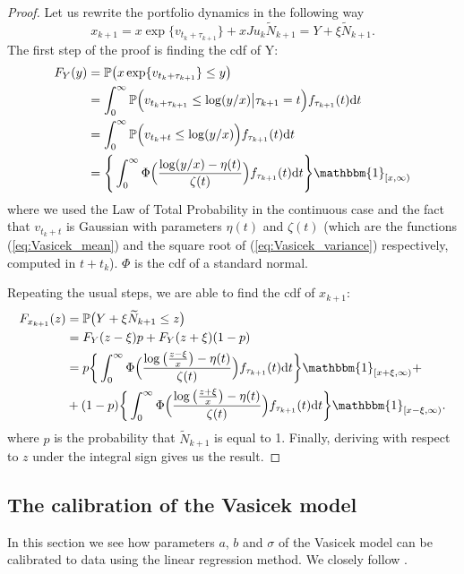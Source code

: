 \begin{proof}
	Let us rewrite the portfolio dynamics in the following way
	\[
	x_{k+1}=x\exp\{v_{t_k+\tau_{k+1}}\} + xJu_k\widetilde{N}_{k+1}=Y+\xi\widetilde{N}_{k+1}.
	\]
	The first step of the proof is finding the cdf of Y:
	\begin{align*}
	F_Y(y) & = \mathbb{P}\big(x\exp\{v_{t_k+\tau_{k+1}}\}\leq y\big)\\
	& = \int_{0}^{\infty}\mathbb{P}\Big(v_{t_k+\tau_{k+1}}\leq \log(y/x)\big\lvert \tau_{k+1}=t\Big)f_{\tau_{k+1}}(t)\mathrm{d}t\\
	& = \int_{0}^{\infty}\mathbb{P}\Big(v_{t_k+t}\leq \log(y/x)\Big)f_{\tau_{k+1}}(t)\mathrm{d}t\\
	& = \Bigg\{\int_{0}^{\infty}\Phi\Big(\frac{\log(y/x)-\eta(t)}{\zeta(t)}\Big)f_{\tau_{k+1}}(t)\mathrm{d}t \Bigg\}\mathbbm{1}_{[x,\infty)}
	\end{align*}
	where we used the Law of Total Probability in the continuous case and the fact that $v_{t_k+t}$ is Gaussian with parameters $\eta(t)$ and $\zeta(t)$ (which are the functions (\ref{eq:Vasicek_mean}) and the square root of (\ref{eq:Vasicek_variance}) respectively, computed in $t+t_k$). $\Phi$ is the cdf of a standard normal.
	
	
Repeating the usual steps, we are able to find the cdf of $x_{k+1}$:
\begin{align*}
F_{x_{k+1}}(z) & = \mathbb{P}\big(Y+\xi\widetilde{N}_{k+1}\leq z\big) \\
& = F_Y(z-\xi)p+F_Y(z+\xi)(1-p)\\
& = p\bigg\{ \int_{0}^{\infty}\Phi\Big(\frac{\log\big(\frac{z-\xi}{x}\big)-\eta(t)}{\zeta(t)}\Big)f_{\tau_{k+1}}(t)\mathrm{d}t\bigg\}\mathbbm{1}_{[x+\xi,\infty)}+\\
& + (1-p)\bigg\{ \int_{0}^{\infty}\Phi\Big(\frac{\log\big(\frac{z+\xi}{x}\big)-\eta(t)}{\zeta(t)}\Big)f_{\tau_{k+1}}(t)\mathrm{d}t\bigg\}\mathbbm{1}_{[x-\xi,\infty)}.
\end{align*}
where $p$ is the probability that $\widetilde{N}_{k+1}$ is equal to 1. Finally, deriving with respect to $z$ under the integral sign gives us the result.
\end{proof}

\subsection{The calibration of the Vasicek model}
In this section we see how parameters $a$, $b$ and $\sigma$ of the Vasicek model can be calibrated to data using the linear regression method. We closely follow \cite{Bernal2016}.

